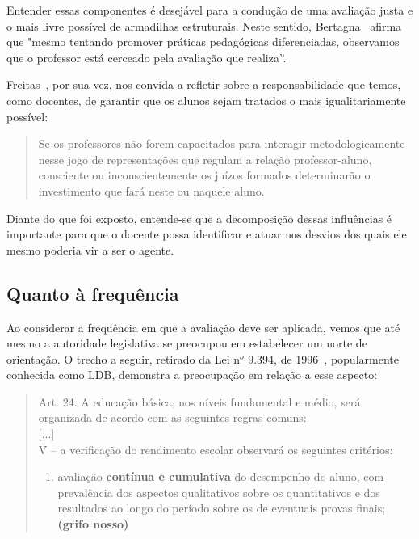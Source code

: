 Entender essas componentes é desejável para a condução de uma avaliação justa e o mais livre possível de armadilhas estruturais. Neste sentido, Bertagna~\cite{bertagna2006} afirma que "mesmo tentando promover práticas pedagógicas diferenciadas, observamos que o professor está cerceado pela avaliação que realiza''.

Freitas~\cite{de2003ciclos}, por sua vez, nos convida a refletir sobre a responsabilidade que temos, como docentes, de garantir que os alunos sejam tratados o mais igualitariamente possível:

\begin{quote}
Se os professores não forem capacitados para interagir metodologicamente nesse jogo de representações que regulam a relação professor-aluno, consciente ou inconscientemente os juízos formados determinarão o investimento que fará neste ou naquele aluno.~\cite{de2003ciclos}
\end{quote}%

Diante do que foi exposto, entende-se que a decomposição dessas influências é importante para que o docente possa identificar e atuar nos desvios dos quais ele mesmo poderia vir a ser o agente. 

\subsection{Quanto à frequência}%
Ao considerar a frequência em que a avaliação deve ser aplicada, vemos que até mesmo a autoridade legislativa se preocupou em estabelecer um norte de orientação. O trecho a seguir, retirado da Lei n{$^o$} 9.394, de 1996~\cite{brasilLDB}, popularmente conhecida como \acrfull{LDB},  demonstra a preocupação em relação a esse aspecto:


\begin{quote}
Art. 24. A educação básica, nos níveis fundamental e médio, será organizada de acordo com as seguintes regras comuns: \\
{[...]} \\
V – a verificação do rendimento escolar observará os seguintes critérios:
\renewcommand{\labelenumi}{\alph{enumi})}
\begin{enumerate}
\item avaliação \textbf{contínua e cumulativa} do desempenho do aluno, com prevalência dos aspectos qualitativos sobre os quantitativos e dos resultados ao longo do período sobre os de eventuais provas finais; \textbf{(grifo nosso)}~\cite{brasilLDB}
\end{enumerate}
\end{quote}%

